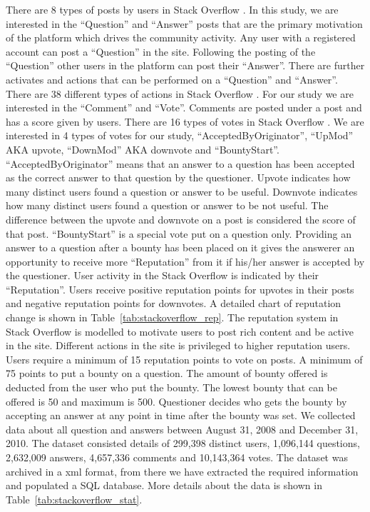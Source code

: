 There are 8 types of posts by users in Stack Overflow \cite{b1}. In this study, we are interested in the “Question” and “Answer” posts that are the primary motivation of the platform which drives the community activity. Any user with a registered account can post a “Question” in the site. Following the posting of the “Question” other users in the platform can post their “Answer”. There are further activates and actions that can be performed on a “Question” and “Answer”. 
There are 38 different types of actions in Stack Overflow \cite{b1}. For our study we are interested in the “Comment” and “Vote”. Comments are posted under a post and has a score given by users. There are 16 types of votes in Stack Overflow \cite{b1}. We are interested in 4 types of votes for our study, “AcceptedByOriginator”, “UpMod” AKA upvote, “DownMod” AKA downvote and “BountyStart”.  “AcceptedByOriginator” means that an answer to a question has been accepted as the correct answer to that question by the questioner. Upvote indicates how many distinct users found a question or answer to be useful. Downvote indicates how many distinct users found a question or answer to be not useful. The difference between the upvote and downvote on a post is considered the score of that post. “BountyStart” is a special vote put on a question only. Providing an answer to a question after a bounty has been placed on it gives the answerer an opportunity to receive more “Reputation” from it if his/her answer is accepted by the questioner.
User activity in the Stack Overflow is indicated by their “Reputation”. Users receive positive reputation points for upvotes in their posts and negative reputation points for downvotes. A detailed chart of reputation change is shown in Table~\ref{tab:stackoverflow_rep}. The reputation system in Stack Overflow is modelled to motivate users to post rich content and be active in the site. Different actions in the site is privileged to higher reputation users. Users require a minimum of 15 reputation points to vote on posts. A minimum of 75 points to put a bounty on a question. The amount of bounty offered is deducted from the user who put the bounty. The lowest bounty that can be offered is 50 and maximum is 500. Questioner decides who gets the bounty by accepting an answer at any point in time after the bounty was set.
We collected data about all question and answers between August 31, 2008 and December 31, 2010. The dataset consisted details of 299,398 distinct users, 1,096,144 questions, 2,632,009 answers, 4,657,336 comments and 10,143,364 votes. The dataset was archived in a xml format, from there we have extracted the required information and populated a SQL database. More details about the data is shown in Table~\ref{tab:stackoverflow_stat}.
